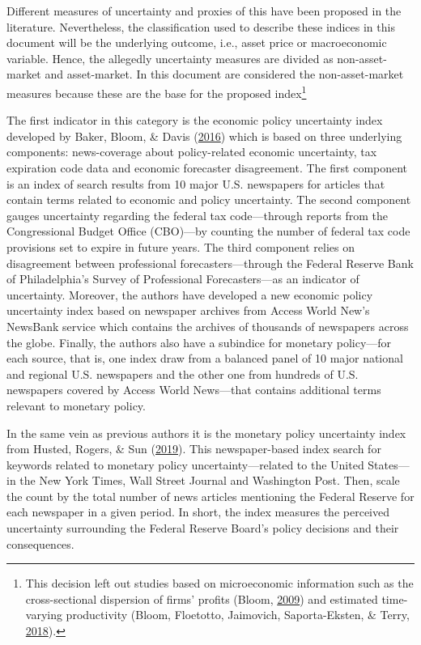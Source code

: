 \documentclass[12pt,twoside]{reedthesis}
\begin{document}
Different measures of uncertainty and proxies of this have been proposed in the literature. Nevertheless, the classification used to describe these indices in this document will be the underlying outcome, i.e., asset price or macroeconomic variable. Hence, the allegedly uncertainty measures are divided as non-asset-market and asset-market. In this document are considered the non-asset-market measures because these are the base for the proposed index\footnote{This decision left out studies based on microeconomic information such as the cross-sectional dispersion of ﬁrms' proﬁts (Bloom, \protect\hyperlink{ref-bloom:2009}{2009}) and estimated time-varying productivity (Bloom, Floetotto, Jaimovich, Saporta-Eksten, \& Terry, \protect\hyperlink{ref-blooetal:2018}{2018}).}

The first indicator in this category is the economic policy uncertainty index developed by Baker, Bloom, \& Davis (\protect\hyperlink{ref-bakeetal:2016}{2016}) which is based on three underlying components: news-coverage about policy-related economic uncertainty, tax expiration code data and economic forecaster disagreement. The first component is an index of search results from 10 major U.S. newspapers for articles that contain terms related to economic and policy uncertainty. The second component gauges uncertainty regarding the federal tax code---through reports from the Congressional Budget Office (CBO)---by counting the number of federal tax code provisions set to expire in future years. The third component relies on disagreement between professional forecasters---through the Federal Reserve Bank of Philadelphia's Survey of Professional Forecasters---as an indicator of uncertainty. Moreover, the authors have developed a new economic policy uncertainty index based on newspaper archives from Access World New's NewsBank service which contains the archives of thousands of newspapers across the globe. Finally, the authors also have a subindice for monetary policy---for each source, that is, one index draw from a balanced panel of 10 major national and regional U.S. newspapers and the other one from hundreds of U.S. newspapers covered by Access World News---that contains additional terms relevant to monetary policy.

In the same vein as previous authors it is the monetary policy uncertainty index from Husted, Rogers, \& Sun (\protect\hyperlink{ref-hustetal:2019}{2019}). This newspaper-based index search for keywords related to monetary policy uncertainty---related to the United States---in the New York Times, Wall Street Journal and Washington Post. Then, scale the count by the total number of news articles mentioning the Federal Reserve for each newspaper in a given period. In short, the index measures the perceived uncertainty surrounding the Federal Reserve Board's policy decisions and their consequences.
\end{document}
